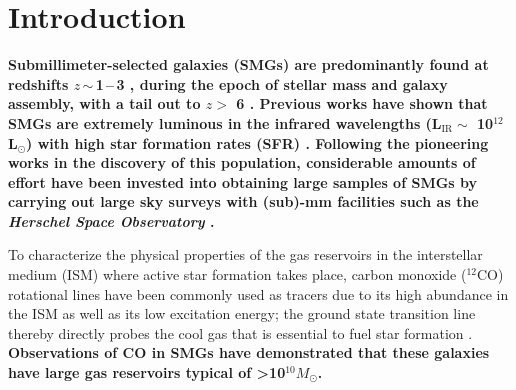 \documentclass[iop, revtex4]{emulateapj}
\newcommand{\Msun}{\mbox{$M_{\odot}$}}
\newcommand{\Lsun}{\mbox{L$_{\odot}$}}
\newcommand{\eg}{{\sl e.g.,~}}
\newcommand{\pmOne}{\mbox{$^{-1}$}}
\begin{document}
\section{Introduction}\label{sec:intro}
{\bf Submillimeter-selected galaxies (SMGs) are predominantly found at redshifts $z$\,$\sim$\,1\,--\,3 \citep{Chapman05a}, during the epoch of stellar mass and
galaxy assembly, with a tail out to $z>$ 6 \citep{Riechers13a}. 
Previous works %
have shown that SMGs
 are extremely luminous in the infrared
 wavelengths (L$_\textrm{IR} \sim$ 10$^{12}$ \Lsun) with high star formation rates (SFR) \citep[$\gtrsim $ 500 \Msun yr\pmOne; see \eg reviews by][]{Blain02a, Lagache05a,Casey14a}.  
{\bf Following the pioneering works in the discovery of this population}, considerable amounts of effort have been invested into 
obtaining large samples of SMGs by carrying out
  large sky surveys with (sub)-mm facilities such as the {\it Herschel Space Observatory} \citep[\eg H-ATLAS, SPT, HerMES; ][]{Eales10a,Carlstrom11a,Oliver12a}.  
  }
  
  To characterize the physical properties of the gas reservoirs in the interstellar medium (ISM) where active star formation takes place, carbon monoxide ($^{12}$CO) rotational lines have been commonly used as tracers due to its high abundance in the ISM as well as its low excitation energy; the ground state transition line thereby directly probes the cool gas that is essential to fuel star formation \citep[see \eg reviews by][]{Solomon05a,Carilli13a}.{ \bf Observations of CO in SMGs 
  have demonstrated that these galaxies have large gas reservoirs typical of \textgreater 10$^{10}$\Msun \citep[\eg][]{Frayer98a, Neri03a, Riechers11c, Riechers11d, Ivison11a, Bothwell13a}.}
\end{document}
